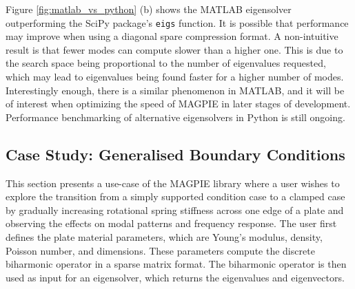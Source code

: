 Figure \ref{fig:matlab_vs_python} (b) shows the MATLAB eigensolver outperforming the SciPy package's \texttt{eigs} function. It is possible that performance may improve when using a diagonal spare compression format. A non-intuitive result is that fewer modes can compute slower than a higher one. This is due to the search space being proportional to the number of eigenvalues requested, which may lead to eigenvalues being found faster for a higher number of modes. Interestingly enough, there is a similar phenomenon in MATLAB, and it will be of interest when optimizing the speed of MAGPIE in later stages of development. Performance benchmarking of alternative eigensolvers in Python is still ongoing.


\subsection{Case Study: Generalised Boundary Conditions}


This section presents a use-case of the MAGPIE library where a user wishes to explore the transition from a simply supported condition case to a clamped case by gradually increasing rotational spring stiffness across one edge of a plate and observing the effects on modal patterns and frequency response. The user first defines the plate material parameters, which are Young's modulus, density, Poisson number, and dimensions. These parameters compute the discrete biharmonic operator in a sparse matrix format. The biharmonic operator is then used as input for an eigensolver, which returns the eigenvalues and eigenvectors.

